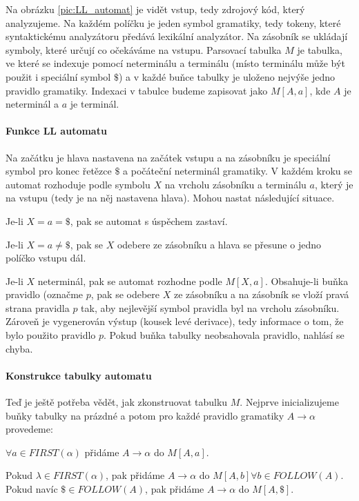Na obrázku \ref{pic:LL_automat} je vidět vstup, tedy zdrojový kód, který analyzujeme. Na každém políčku je jeden symbol gramatiky, tedy tokeny, které syntaktickému analyzátoru předává lexikální analyzátor. Na zásobník se ukládají symboly, které určují co očekáváme na vstupu. Parsovací tabulka \(M\) je tabulka, ve které se indexuje pomocí neterminálu a terminálu (místo terminálu může být použit i speciální symbol \(\$\)) a v každé buňce tabulky je uloženo nejvýše jedno pravidlo gramatiky. Indexaci v tabulce budeme zapisovat jako \(M[A, a]\), kde \(A\) je neterminál a \(a\) je terminál.

\paragraph{Funkce LL automatu} Na začátku je hlava nastavena na začátek vstupu a na zásobníku je speciální symbol pro konec řetězce \(\$\) a počáteční neterminál gramatiky. V každém kroku se automat rozhoduje podle symbolu \(X\) na vrcholu zásobníku a terminálu \(a\), který je na vstupu (tedy je na něj nastavena hlava). Mohou nastat následující situace.

\begin{pitemize}
	\item Je-li \(X = a = \$\), pak se automat s úspěchem zastaví.
	\item Je-li \(X = a \neq \$\), pak se \(X\) odebere ze zásobníku a hlava se přesune o jedno políčko vstupu dál.
	\item Je-li \(X\) neterminál, pak se automat rozhodne podle \(M[X, a]\). Obsahuje-li buňka pravidlo (označme \(p\), pak se odebere \(X\) ze zásobníku a na zásobník se vloží pravá strana pravidla \(p\) tak, aby nejlevější symbol pravidla byl na vrcholu zásobníku. Zároveň je vygenerován výstup (kousek levé derivace), tedy informace o tom, že bylo použito pravidlo \(p\). Pokud buňka tabulky neobsahovala pravidlo, nahlásí se chyba.
\end{pitemize}

\paragraph{Konstrukce tabulky automatu} Teď je ještě potřeba vědět, jak zkonstruovat tabulku \(M\). Nejprve inicializujeme buňky tabulky na prázdné a potom pro každé pravidlo gramatiky \(A \to \alpha\) provedeme:

\begin{penumerate}
	\item \(\forall a \in FIRST(\alpha)\) přidáme \(A \to \alpha\) do \(M[A, a]\).
	\item Pokud \(\lambda \in FIRST(\alpha)\), pak přidáme \(A \to \alpha\) do \(M[A, b] \forall b \in FOLLOW(A)\). Pokud navíc \(\$ \in FOLLOW(A)\), pak přidáme \(A \to \alpha\) do \(M[A, \$]\).
\end{penumerate}

